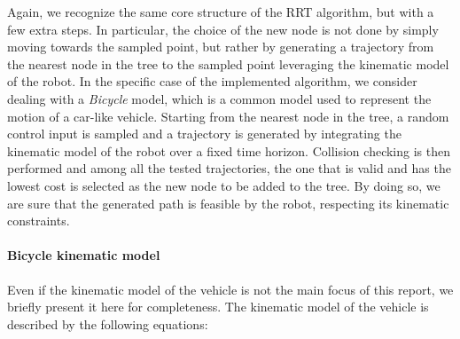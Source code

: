 Again, we recognize the same core structure of the RRT algorithm, but with a few extra steps.
In particular, the choice of the new node is not done by simply moving towards the sampled point, but rather by generating a trajectory from the nearest node in the tree to the sampled point leveraging the kinematic model of the robot.
In the specific case of the implemented algorithm, we consider dealing with a \textit{Bicycle} model, which is a common model used to represent the motion of a car-like vehicle.
Starting from the nearest node in the tree, a random control input is sampled and a trajectory is generated by integrating the kinematic model of the robot over a fixed time horizon.
Collision checking is then performed and among all the tested trajectories, the one that is valid and has the lowest cost is selected as the new node to be added to the tree.
By doing so, we are sure that the generated path is feasible by the robot, respecting its kinematic constraints.

\paragraph{Bicycle kinematic model}

Even if the kinematic model of the vehicle is not the main focus of this report, we briefly present it here for completeness.
The kinematic model of the vehicle is described by the following equations:

